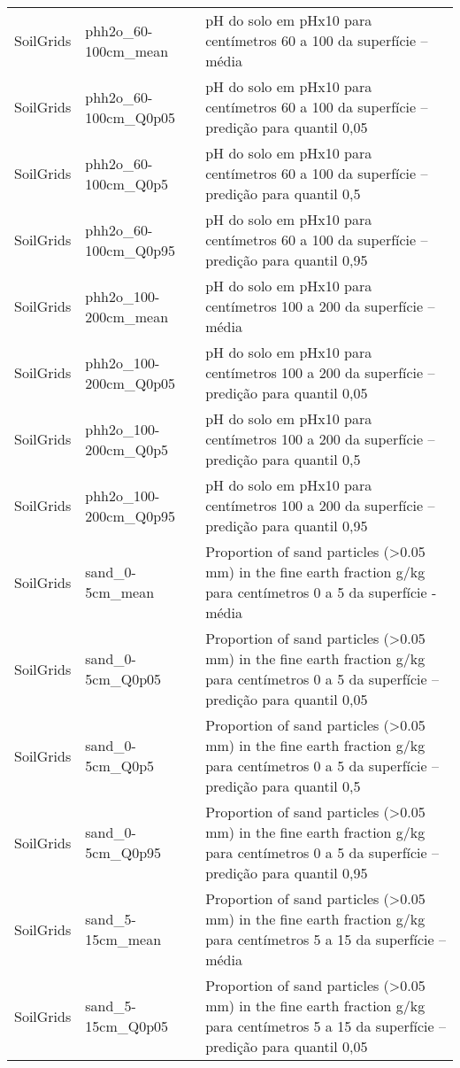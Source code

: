 \begin{longtable}{@{} p{4cm} p{4cm} p{8cm} @{}}
	SoilGrids &
	phh2o\_60-100cm\_mean &
	pH do solo em pHx10 para centímetros 60 a 100 da superfície – média \\
	SoilGrids &
	phh2o\_60-100cm\_Q0p05 &
	pH do solo em pHx10 para centímetros 60 a 100 da superfície – predição para quantil 0,05 \\
	SoilGrids &
	phh2o\_60-100cm\_Q0p5 &
	pH do solo em pHx10 para centímetros 60 a 100 da superfície – predição para quantil 0,5 \\
	SoilGrids &
	phh2o\_60-100cm\_Q0p95 &
	pH do solo em pHx10 para centímetros 60 a 100 da superfície – predição para quantil 0,95 \\
	SoilGrids &
	phh2o\_100-200cm\_mean &
	pH do solo em pHx10 para centímetros 100 a 200 da superfície – média \\
	SoilGrids &
	phh2o\_100-200cm\_Q0p05 &
	pH do solo em pHx10 para centímetros 100 a 200 da superfície – predição para quantil 0,05 \\
	SoilGrids &
	phh2o\_100-200cm\_Q0p5 &
	pH do solo em pHx10 para centímetros 100 a 200 da superfície – predição para quantil 0,5 \\
	SoilGrids &
	phh2o\_100-200cm\_Q0p95 &
	pH do solo em pHx10 para centímetros 100 a 200 da superfície – predição para quantil 0,95 \\
	SoilGrids &
	sand\_0-5cm\_mean &
	Proportion of sand particles (\textgreater 0.05 mm) in the fine earth fraction g/kg para centímetros 0 a 5 da superfície - média \\
	SoilGrids &
	sand\_0-5cm\_Q0p05 &
	Proportion of sand particles (\textgreater 0.05 mm) in the fine earth fraction g/kg para centímetros 0 a 5 da superfície – predição para quantil 0,05 \\
	SoilGrids &
	sand\_0-5cm\_Q0p5 &
	Proportion of sand particles (\textgreater 0.05 mm) in the fine earth fraction g/kg para centímetros 0 a 5 da superfície – predição para quantil 0,5 \\
	SoilGrids &
	sand\_0-5cm\_Q0p95 &
	Proportion of sand particles (\textgreater 0.05 mm) in the fine earth fraction g/kg para centímetros 0 a 5 da superfície – predição para quantil 0,95 \\
	SoilGrids &
	sand\_5-15cm\_mean &
	Proportion of sand particles (\textgreater 0.05 mm) in the fine earth fraction g/kg para centímetros 5 a 15 da superfície – média \\
	SoilGrids &
	sand\_5-15cm\_Q0p05 &
	Proportion of sand particles (\textgreater 0.05 mm) in the fine earth fraction g/kg para centímetros 5 a 15 da superfície – predição para quantil 0,05 \\

\end{longtable}
